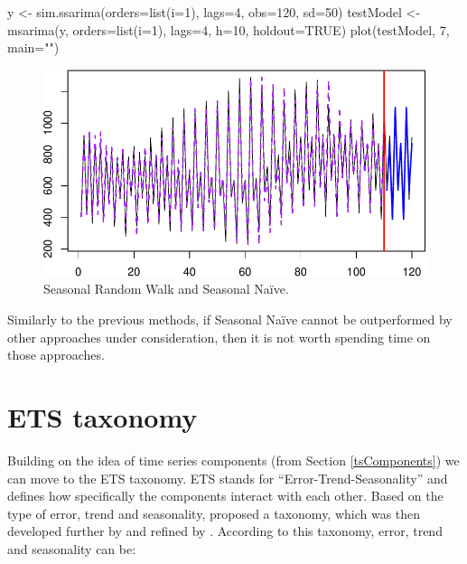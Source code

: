 \documentclass[
]{book}
\newenvironment{Shaded}{\begin{snugshade}}{\end{snugshade}}
\newcommand{\AttributeTok}[1]{\textcolor[rgb]{0.77,0.63,0.00}{#1}}
\newcommand{\ConstantTok}[1]{\textcolor[rgb]{0.00,0.00,0.00}{#1}}
\newcommand{\DecValTok}[1]{\textcolor[rgb]{0.00,0.00,0.81}{#1}}
\newcommand{\FunctionTok}[1]{\textcolor[rgb]{0.00,0.00,0.00}{#1}}
\newcommand{\NormalTok}[1]{#1}
\newcommand{\OtherTok}[1]{\textcolor[rgb]{0.56,0.35,0.01}{#1}}
\newcommand{\StringTok}[1]{\textcolor[rgb]{0.31,0.60,0.02}{#1}}
\theoremstyle{definition}
\theoremstyle{definition}
\theoremstyle{definition}
\theoremstyle{definition}
\theoremstyle{remark}
\begin{document}
\begin{Shaded}
\begin{Highlighting}[]
\NormalTok{y }\OtherTok{\textless{}{-}} \FunctionTok{sim.ssarima}\NormalTok{(}\AttributeTok{orders=}\FunctionTok{list}\NormalTok{(}\AttributeTok{i=}\DecValTok{1}\NormalTok{), }\AttributeTok{lags=}\DecValTok{4}\NormalTok{,}
                 \AttributeTok{obs=}\DecValTok{120}\NormalTok{, }\AttributeTok{sd=}\DecValTok{50}\NormalTok{)}
\NormalTok{testModel }\OtherTok{\textless{}{-}} \FunctionTok{msarima}\NormalTok{(y, }\AttributeTok{orders=}\FunctionTok{list}\NormalTok{(}\AttributeTok{i=}\DecValTok{1}\NormalTok{), }\AttributeTok{lags=}\DecValTok{4}\NormalTok{,}
                     \AttributeTok{h=}\DecValTok{10}\NormalTok{, }\AttributeTok{holdout=}\ConstantTok{TRUE}\NormalTok{)}
\FunctionTok{plot}\NormalTok{(testModel, }\DecValTok{7}\NormalTok{, }\AttributeTok{main=}\StringTok{""}\NormalTok{)}
\end{Highlighting}
\end{Shaded}

\begin{figure}
\centering
\includegraphics{adam_files/figure-latex/NaiveSeasonalExample-1.pdf}
\caption{\label{fig:NaiveSeasonalExample}Seasonal Random Walk and Seasonal Naïve.}
\end{figure}

Similarly to the previous methods, if Seasonal Naïve cannot be outperformed by other approaches under consideration, then it is not worth spending time on those approaches.

\hypertarget{ETSTaxonomy}{%
\section{ETS taxonomy}\label{ETSTaxonomy}}

Building on the idea of time series components (from Section \ref{tsComponents}) we can move to the ETS taxonomy. ETS stands for ``Error-Trend-Seasonality'' and defines how specifically the components interact with each other. Based on the type of error, trend and seasonality, \citep{Pegels1969} proposed a taxonomy, which was then developed further by \citep{Hyndman2002} and refined by \citep{Hyndman2008b}. According to this taxonomy, error, trend and seasonality can be:
\end{document}
